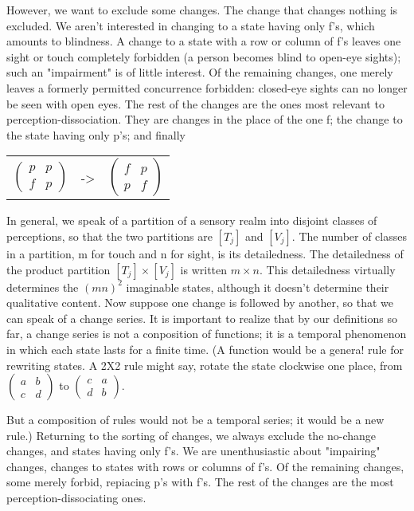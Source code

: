 \documentclass[10pt,twoside,draft]{memoir}
\begin{document}
{However, 
we want to exclude some changes. The change that changes nothing is 
excluded. We aren't interested in changing to a state having only f's, which 
amounts to blindness. A change to a state with a row or column of f's leaves 
one sight or touch completely forbidden (a person becomes blind to 
open-eye sights); such an "impairment" is of little interest. Of the remaining 
changes, one merely leaves a formerly permitted concurrence forbidden: 
closed-eye sights can no longer be seen with open eyes. The rest of the 
changes are the ones most relevant to perception-dissociation. They are 
changes in the place of the one f; the change to the state having only p's; 
and finally 


\begin{tabular}{ r c l }
	$\begin{pmatrix}
		p & p \\
		f & p
	\end{pmatrix}$ &
	->
	&
	$\begin{pmatrix}
		f & p \\
		p & f
	\end{pmatrix}$ \\
\end{tabular}

In general, we speak of a partition of a sensory realm into disjoint 
classes of perceptions, so that the two partitions are $[T_j]$ and $[V_j]$. The 
number of classes in a partition, m for touch and n for sight, is its 
detailedness. The detailedness of the product partition $[T_j]\times [V_j]$ is written 
$m\times n$. This detailedness virtually determines the $(mn)^2$ imaginable states, 
although it doesn't determine their qualitative content. Now suppose one 
change is followed by another, so that we can speak of a change series. It is 
important to realize that by our definitions so far, a change series is not a 
conposition of functions; it is a temporal phenomenon in which each state 
lasts for a finite time. (A function would be a genera! rule for rewriting 
states. A 2X2 rule might say, rotate the state clockwise one place, from
$\begin{pmatrix}a & b \\ c & d\end{pmatrix}$ to
$\begin{pmatrix}c & a \\ d & b\end{pmatrix}$.

But a composition of rules would not be a temporal series; it would be a new 
rule.) Returning to the sorting of changes, we always exclude the no-change 
changes, and states having only f's. We are unenthusiastic about "impairing"
changes, changes to states with rows or columns of f's. Of the remaining 
changes, some merely forbid, repiacing p's with f's. The rest of the changes 
are the most perception-dissociating ones. 

}
\end{document}
